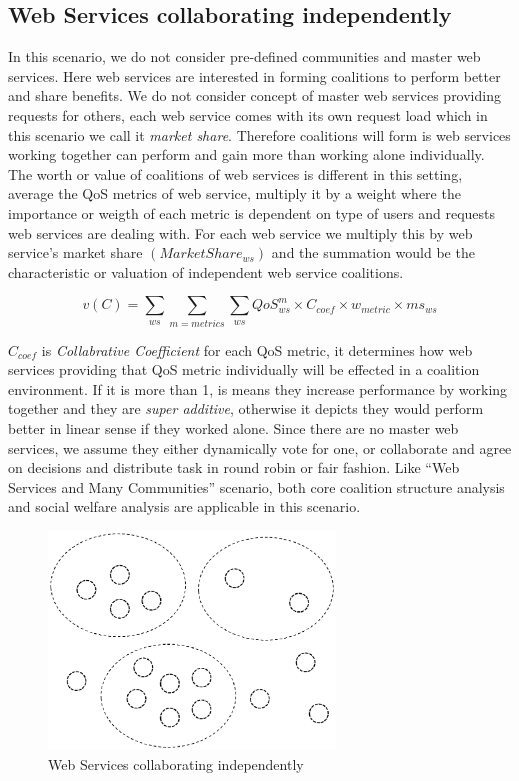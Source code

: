 \documentclass[10pt, conference, compsocconf]{IEEEtran}
\theoremstyle{plain}
\theoremstyle{definition}
\begin{document}
\subsection {Web Services collaborating independently}

In this scenario, we do not consider pre-defined communities and master web services. Here web services are interested in forming coalitions to perform better and share benefits. We do not consider concept of master web services providing requests for others, each web service comes with its own request load which in this scenario we call it \emph{market share}. Therefore coalitions will form is web services working together can perform and gain more than working alone individually. The worth or value of coalitions of web services is different in this setting, average the QoS metrics of web service, multiply it by a weight where the importance or weigth of each metric is dependent on type of users and requests web services are dealing with. For each web service we multiply this by web service's market share $(MarketShare_{ws})$ and the summation would be the characteristic or valuation of independent web service coalitions.

\begin{equation*}
v(C) = \sum_{ws}{\sum_{m=metrics}{\sum_{ws}{QoS^m_{ws} \times C_{coef}} \times w_{metric} } \times ms_{ws}}
\end{equation*} 

$C_{coef}$ is \emph{Collabrative Coefficient} for each QoS metric, it determines how web services providing that QoS metric individually will be effected in a coalition environment. If it is more than 1, is means they increase performance by working together and they are \emph{super additive}, otherwise it depicts they would perform better in linear sense if they worked alone. Since there are no master web services, we assume they either dynamically vote for one, or collaborate and agree on decisions and distribute task in round robin or fair fashion. Like ``Web Services and Many Communities'' scenario, both core coalition structure analysis and social welfare analysis are applicable in this scenario.

\begin{figure}[!t]
\centering
\includegraphics[width=3in]{s3.eps}
\caption{Web Services collaborating independently}
\label{fig_sim}
\end{figure}
\end{document}
